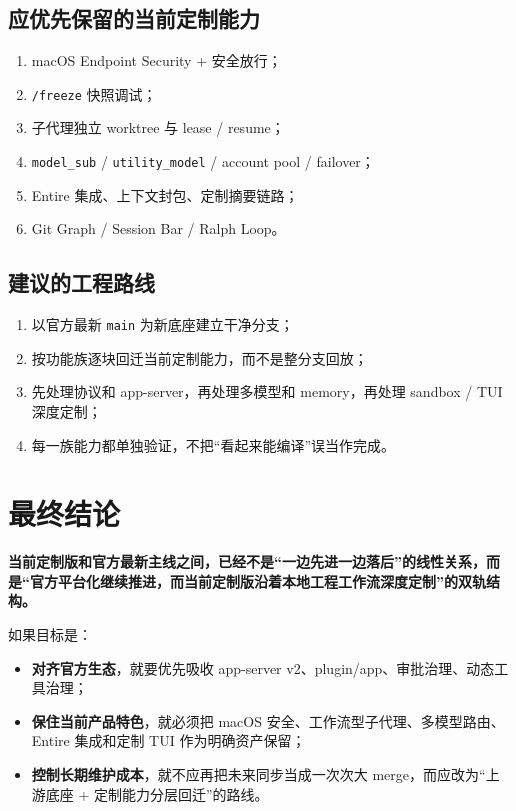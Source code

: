 \documentclass[UTF8,11pt]{ctexart}
\begin{document}
\subsection{应优先保留的当前定制能力}
\begin{enumerate}[nosep]
  \item macOS Endpoint Security + 安全放行；
  \item \texttt{/freeze} 快照调试；
  \item 子代理独立 worktree 与 lease / resume；
  \item \texttt{model\_sub} / \texttt{utility\_model} / account pool / failover；
  \item Entire 集成、上下文封包、定制摘要链路；
  \item Git Graph / Session Bar / Ralph Loop。
\end{enumerate}

\subsection{建议的工程路线}
\begin{enumerate}[nosep]
  \item 以官方最新 \texttt{main} 为新底座建立干净分支；
  \item 按功能族逐块回迁当前定制能力，而不是整分支回放；
  \item 先处理协议和 app-server，再处理多模型和 memory，再处理 sandbox / TUI 深度定制；
  \item 每一族能力都单独验证，不把“看起来能编译”误当作完成。
\end{enumerate}

\section{最终结论}
\textbf{当前定制版和官方最新主线之间，已经不是“一边先进一边落后”的线性关系，而是“官方平台化继续推进，而当前定制版沿着本地工程工作流深度定制”的双轨结构。}

如果目标是：
\begin{itemize}[nosep]
  \item \textbf{对齐官方生态}，就要优先吸收 app-server v2、plugin/app、审批治理、动态工具治理；
  \item \textbf{保住当前产品特色}，就必须把 macOS 安全、工作流型子代理、多模型路由、Entire 集成和定制 TUI 作为明确资产保留；
  \item \textbf{控制长期维护成本}，就不应再把未来同步当成一次次大 merge，而应改为“上游底座 + 定制能力分层回迁”的路线。
\end{itemize}
\end{document}
